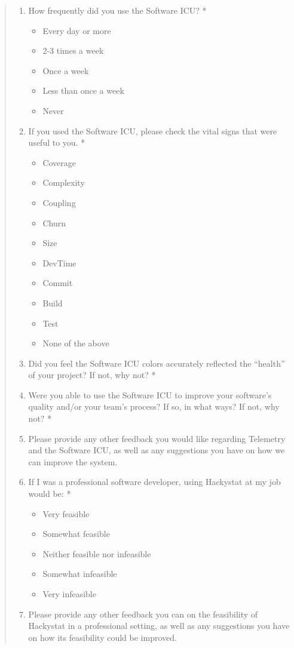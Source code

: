 \documentclass[11pt]{article}
\begin{document}
\begin{quote}
\begin{enumerate}
\item How frequently did you use the Software ICU? *
\begin{itemize}
\item Every day or more
\item 2-3 times a week
\item Once a week
\item Less than once a week
\item Never
\end{itemize}

\item If you used the Software ICU, please check the vital signs that were useful to you. *
\begin{itemize}
\item Coverage
\item Complexity
\item Coupling
\item Churn
\item Size
\item DevTime
\item Commit
\item Build
\item Test
\item None of the above
\end{itemize}

\item Did you feel the Software ICU colors accurately reflected the ``health'' of your project? If not, why not? *

\item Were you able to use the Software ICU to improve your software's quality and/or your team's process? If so, in what ways? If not, why not? *

\item Please provide any other feedback you would like regarding Telemetry and the Software ICU, as well as any suggestions you have on how we can improve the system.

\item If I was a professional software developer, using Hackystat at my job would be: *
\begin{itemize}
\item Very feasible
\item Somewhat feasible
\item Neither feasible nor infeasible
\item Somewhat infeasible
\item Very infeasible
\end{itemize}

\item Please provide any other feedback you can on the feasibility of Hackystat in a professional setting, as well as any suggestions you have on how its feasibility could be improved. 

\end{enumerate}

\end{quote}
\end{document}
